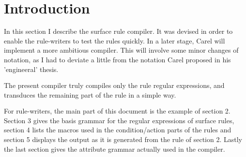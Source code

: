    
      \RosSupersedes{-}
      \MakeRosTitle
\section{Introduction}
In this section I describe the surface rule compiler. It was devised in order
to enable the rule-writers to test the rules quickly. In a later stage, Carel
will implement a more ambitious compiler. This will involve some minor changes
of notation, as I had to deviate a little from the notation Carel proposed in
his 'engineeral' thesis.

The present compiler truly compiles only
the rule regular expressions, and transduces the remaining part of the rule in
a simple way.

For rule-writers, the main part of this document is the example of section 2.
Section 3 gives the basis grammar for the regular expressions of surface rules,
section 4 lists the macros used in the condition/action parts of the rules and
section 5 displays the output as it is generated from the rule of section 2.
Lastly the last section gives the attribute grammar actually used in the
compiler.
